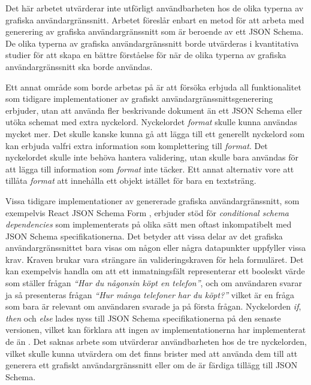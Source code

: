 Det här arbetet utvärderar inte utförligt användbarheten hos de olika typerna av grafiska användargränssnitt. Arbetet föreslår enbart en metod för att arbeta med generering av grafiska användargränssnitt som är beroende av ett JSON Schema. De olika typerna av grafiska användargränssnitt borde utvärderas i kvantitativa studier för att skapa en bättre förståelse för när de olika typerna av grafiska användargränssnitt ska borde användas.

Ett annat område som borde arbetas på är att försöka erbjuda all funktionalitet som tidigare implementationer av grafiskt användargränssnittsgenerering erbjuder, utan att använda fler beskrivande dokument än ett JSON Schema eller utöka schemat med extra nyckelord. Nyckelordet \textit{format} skulle kunna användas mycket mer. Det skulle kanske kunna gå att lägga till ett generellt nyckelord som kan erbjuda valfri extra information som komplettering till \textit{format}. Det nyckelordet skulle inte behöva hantera validering, utan skulle bara användas för att lägga till information som \textit{format} inte täcker. Ett annat alternativ vore att tillåta \textit{format} att innehålla ett objekt istället för bara en textsträng.

Vissa tidigare implementationer av genererade grafiska användargränssnitt, som exempelvis React JSON Schema Form \cite{MozillaServices}, erbjuder stöd för \textit{conditional schema dependencies} som implementerats på olika sätt men oftast inkompatibelt med JSON Schema specifikationerna. Det betyder att vissa delar av det grafiska användargränssnittet bara visas om någon eller några datapunkter uppfyller vissa krav. Kraven brukar vara strängare än valideringskraven för hela formuläret. Det kan exempelvis handla om att ett inmatningsfält representerar ett booleskt värde som ställer frågan \textit{``Har du någonsin köpt en telefon''}, och om användaren svarar ja så presenteras frågan \textit{``Hur många telefoner har du köpt?''} vilket är en fråga som bara är relevant om användaren svarade ja på första frågan. Nyckelorden \textit{if}, \textit{then} och \textit{else} lades nyss till JSON Schema specifikationerna på den senaste versionen, vilket kan förklara att ingen av implementationerna har implementerat de än \cite{Andrews2018}. Det saknas arbete som utvärderar användbarheten hos de tre nyckelorden, vilket skulle kunna utvärdera om det finns brister med att använda dem till att generera ett grafiskt användargränssnitt eller om de är färdiga tillägg till JSON Schema.

